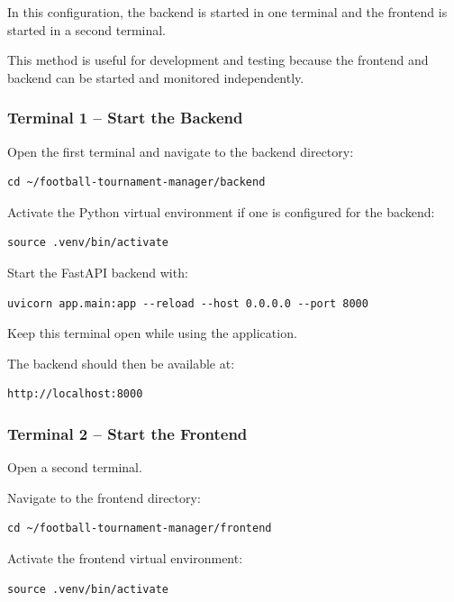 \documentclass[12pt,a4paper]{article}
\begin{document}
In this configuration, the backend is started in one terminal
and the frontend is started in a second terminal.

This method is useful for development and testing because the
frontend and backend can be started and monitored independently.

\subsubsection{Terminal 1 -- Start the Backend}

Open the first terminal and navigate to the backend directory:

\begin{lstlisting}
cd ~/football-tournament-manager/backend
\end{lstlisting}

Activate the Python virtual environment if one is configured
for the backend:

\begin{lstlisting}
source .venv/bin/activate
\end{lstlisting}

Start the FastAPI backend with:

\begin{lstlisting}
uvicorn app.main:app --reload --host 0.0.0.0 --port 8000
\end{lstlisting}

Keep this terminal open while using the application.

The backend should then be available at:

\begin{lstlisting}
http://localhost:8000
\end{lstlisting}

\subsubsection{Terminal 2 -- Start the Frontend}

Open a second terminal.

Navigate to the frontend directory:

\begin{lstlisting}
cd ~/football-tournament-manager/frontend
\end{lstlisting}

Activate the frontend virtual environment:

\begin{lstlisting}
source .venv/bin/activate
\end{lstlisting}
\end{document}
